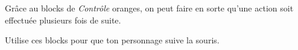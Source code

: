 \documentclass[a4paper,11pt]{article}
\newcommand{\exerciceSpacing}{2em}
\begin{document}
\vspace{\exerciceSpacing}

\begin{exercice}[: Boucles]
	Grâce au blocks de \textit{Contrôle} oranges, on peut faire en sorte qu'une action soit effectuée plusieurs fois de suite. \vspace{1em}

	Utilise ces blocks pour que ton personnage suive la souris.
\end{exercice}
\end{document}
